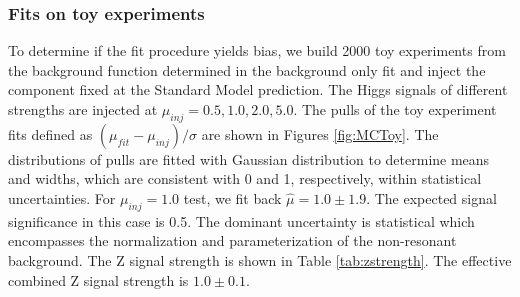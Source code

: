 




\subsubsection{Fits on toy experiments}

To determine if the fit procedure yields bias, we build 2000 toy experiments from the background function determined in the background only fit and inject the \zjets{} component fixed at the Standard Model prediction. The Higgs signals of different strengths are injected at $\mu_{inj} = 0.5, 1.0, 2.0, 5.0$. The pulls of the toy experiment fits defined as $(\mu_{fit}-\mu_{inj})/ \sigma$ are shown in Figures \ref{fig:MCToy}. The distributions of pulls are fitted with Gaussian distribution to determine means and widths, which are consistent with 0 and 1, respectively, within statistical uncertainties. For $\mu_{inj}=1.0$ test, we fit back $\hat{\mu}=1.0\pm 1.9$. %
The expected signal significance in this case is 0.5. The dominant uncertainty is statistical which encompasses the normalization and parameterization of the non-resonant background. The Z signal strength is shown in Table \ref{tab:zstrength}. The effective combined Z signal strength is $1.0\pm 0.1$. %

